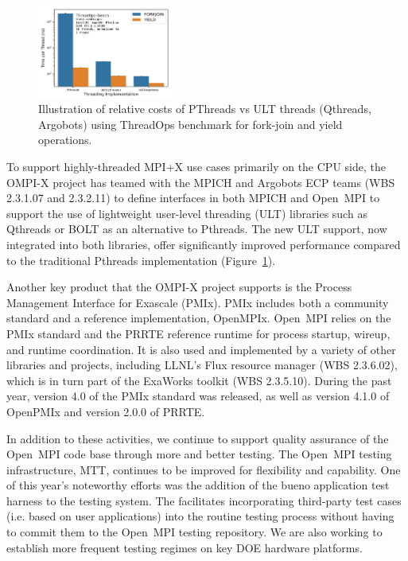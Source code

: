 \begin{figure}
    \includegraphics[width=0.40\textwidth]{projects/2.3.1-PMR/2.3.1.17-OMPI-X/ult-performance.png}
    \caption{Illustration of relative costs of PThreads vs ULT threads (Qthreads, Argobots) using ThreadOps benchmark for fork-join and yield operations.}
    \label{fig:ult-performance}
\end{figure}

To support highly-threaded MPI+X use cases primarily on the CPU side, the OMPI-X project has teamed with the MPICH and Argobots ECP teams (WBS 2.3.1.07 and 2.3.2.11)
to define interfaces in both MPICH and Open~MPI to support the use of lightweight user-level threading (ULT) libraries such as Qthreads or BOLT
as an alternative to Pthreads.  The new ULT support, now integrated into both libraries, offer significantly improved performance compared to 
the traditional Pthreads implementation (Figure~\ref{fig:ult-performance}).

Another key product that the OMPI-X project supports is the Process Management Interface for Exascale (PMIx).  PMIx includes both a community standard
and a reference implementation, OpenMPIx.  Open~MPI relies on the PMIx standard and the PRRTE reference runtime for process startup, wireup, and runtime coordination.
It is also used and implemented by a variety of other libraries and projects, including LLNL's Flux resource manager (WBS 2.3.6.02), which is in turn part of the ExaWorks toolkit (WBS 2.3.5.10).
During the past year, version 4.0 of the PMIx standard was released, as well as version 4.1.0 of OpenPMIx and version 2.0.0 of PRRTE.

In addition to these activities, we continue to support quality assurance of the Open~MPI code base through more and better testing.  The Open~MPI testing infrastructure, 
MTT, continues to be improved for flexibility and capability.  One of this year's noteworthy efforts was the addition of the bueno application test harness to the testing 
system.  The facilitates incorporating third-party test cases (i.e. based on user applications) into the routine testing process without having to commit them to the
Open~MPI testing repository.  We are also working to establish more frequent testing regimes on key DOE hardware platforms.

